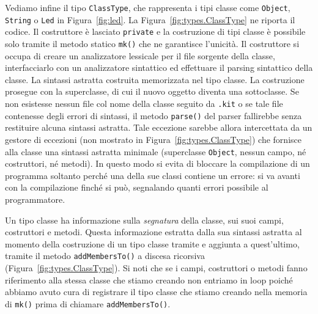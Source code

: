 Vediamo infine il tipo \texttt{ClassType}, che rappresenta i tipi
classe come \texttt{Object},
\texttt{String} o \texttt{Led} in Figura~\ref{fig:led}. La
Figura~\ref{fig:types.ClassType} ne riporta il codice. Il costruttore
\`e lasciato \texttt{private} e la costruzione di tipi classe \`e
possibile solo tramite il metodo statico \texttt{mk()} che ne garantisce
l'unicit\`a. Il costruttore si occupa di creare un analizzatore lessicale per
il file sorgente della classe, interfacciarlo con un analizzatore sintattico
ed effettuare il parsing sintattico della classe. La sintassi astratta \cosi
costruita \e memorizzata nel tipo classe. La costruzione prosegue con la
superclasse, di cui il nuovo oggetto diventa una sottoclasse.
Se non esistesse nessun file col nome della classe seguito
da \texttt{.kit} o se tale file contenesse degli errori di sintassi,
il metodo \texttt{parse()} del parser fallirebbe senza restituire alcuna
sintassi astratta. Tale eccezione sarebbe allora
intercettata da un gestore di eccezioni (non mostrato in
Figura~\ref{fig:types.ClassType}) che fornisce alla classe
una sintassi astratta minimale (superclasse \texttt{Object}, nessun
campo, n\'e costruttori, n\'e metodi). In questo modo si evita di
bloccare la compilazione di un programma soltanto perch\'e una della sue classi
contiene un errore: si va avanti con la compilazione
finch\'e si pu\`o, segnalando quanti \piu errori possibile al programmatore.

Un tipo classe ha informazione sulla \emph{segnatura}
della classe, \cioe sui suoi campi, costruttori e metodi.
Questa informazione \e estratta dalla sua sintassi astratta al momento
della costruzione di un tipo classe tramite e aggiunta a quest'ultimo,
tramite il metodo \texttt{addMembersTo()} a discesa ricorsiva
(Figura~\ref{fig:types.ClassType}). Si noti che se
i campi, costruttori o metodi fanno riferimento alla stessa classe che
stiamo creando non entriamo in loop poich\'e abbiamo avuto cura di
registrare il tipo classe che stiamo creando nella memoria di
\texttt{mk()} prima di chiamare \texttt{addMembersTo()}.

